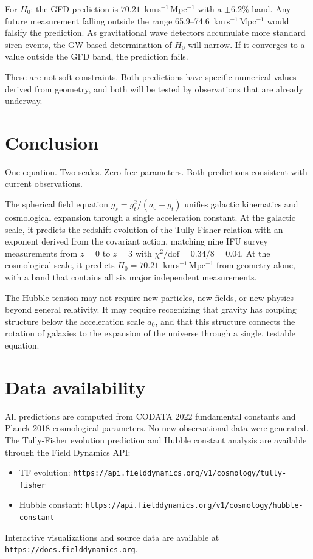 \documentclass[a4paper,11pt]{article}
\begin{document}
For $H_0$: the GFD prediction is $70.21$~km\,s$^{-1}$\,Mpc$^{-1}$ with a $\pm 6.2\%$ band. Any future measurement falling outside the range 65.9--74.6~km\,s$^{-1}$\,Mpc$^{-1}$ would falsify the prediction. As gravitational wave detectors accumulate more standard siren events, the GW-based determination of $H_0$ will narrow. If it converges to a value outside the GFD band, the prediction fails.

These are not soft constraints. Both predictions have specific numerical values derived from geometry, and both will be tested by observations that are already underway.

\section{Conclusion}
\label{sec:conclusion}

One equation. Two scales. Zero free parameters. Both predictions consistent with current observations.

The spherical field equation $g_s = g_t^2/(a_0 + g_t)$ unifies galactic kinematics and cosmological expansion through a single acceleration constant. At the galactic scale, it predicts the redshift evolution of the Tully-Fisher relation with an exponent derived from the covariant action, matching nine IFU survey measurements from $z = 0$ to $z = 3$ with $\chi^2/\mathrm{dof} = 0.34/8 = 0.04$. At the cosmological scale, it predicts $H_0 = 70.21$~km\,s$^{-1}$\,Mpc$^{-1}$ from geometry alone, with a band that contains all six major independent measurements.

The Hubble tension may not require new particles, new fields, or new physics beyond general relativity. It may require recognizing that gravity has coupling structure below the acceleration scale $a_0$, and that this structure connects the rotation of galaxies to the expansion of the universe through a single, testable equation.

\section*{Data availability}

All predictions are computed from CODATA 2022 fundamental constants and Planck 2018 cosmological parameters. No new observational data were generated. The Tully-Fisher evolution prediction and Hubble constant analysis are available through the Field Dynamics API:
\begin{itemize}
\item TF evolution: \texttt{https://api.fielddynamics.org/v1/cosmology/tully-fisher}
\item Hubble constant: \texttt{https://api.fielddynamics.org/v1/cosmology/hubble-constant}
\end{itemize}
Interactive visualizations and source data are available at \texttt{https://docs.fielddynamics.org}.
\end{document}
